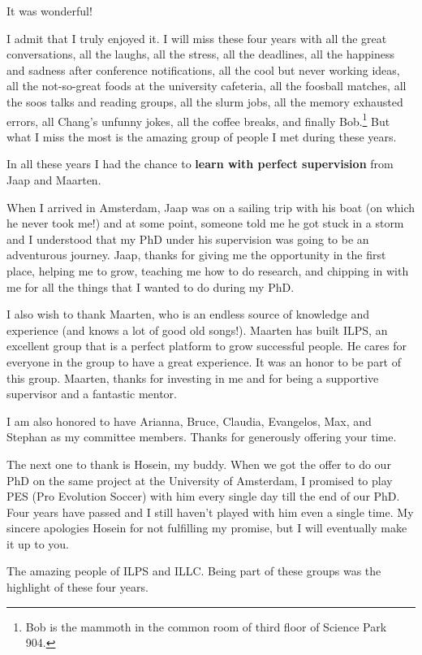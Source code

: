 \acknowledgments

It was wonderful! 

I admit that I truly enjoyed it. I will miss these four years with all the great conversations, all the laughs, all the stress, all the deadlines, all the happiness and sadness after conference notifications,  all the cool but never working ideas, all the not-so-great foods at the university cafeteria, all the foosball matches, all the soos talks and reading groups, all the slurm jobs, all the memory exhausted errors, all Chang's unfunny jokes, all the coffee breaks, and finally Bob.\footnote{Bob is the mammoth in the common room of third floor of Science Park 904.} But what I miss the most is the amazing group of people I met during these years.

In all these years I had the chance to \textbf{learn with perfect supervision} from Jaap and Maarten. 

When I arrived in Amsterdam, Jaap was on a sailing trip with his boat (on which he never took me!) and at some point, someone told me he got stuck in a storm and I understood that my PhD under his supervision was going to be an adventurous journey. Jaap, thanks for giving me the opportunity in the first place, helping me to grow, teaching me how to do research, and chipping in with me for all the things that I wanted to do during my PhD. 

I also wish to thank Maarten, who is an endless source of knowledge and experience (and knows a lot of good old songs!). Maarten has built ILPS,  an excellent group that is a perfect platform to grow successful people. He cares for everyone in the group to have a great experience. It was an honor to be part of this group. Maarten, thanks for investing in me and for being a supportive supervisor and a fantastic mentor. 

I am also honored to have Arianna, Bruce, Claudia, Evangelos, Max, and Stephan as my committee members. Thanks for generously offering your time.

The next one to thank is Hosein, my buddy. When we got the offer to do our PhD on the same project at the University of Amsterdam, I promised to play PES (Pro Evolution Soccer) with him every single day till the end of our PhD. Four years have passed and I still haven't played with him even a single time. My sincere apologies Hosein for not fulfilling my promise, but I will eventually make it up to you.

The amazing people of ILPS and ILLC. Being part of these groups was the highlight of these four years. 

